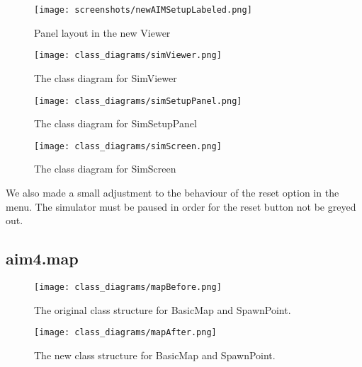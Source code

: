 \begin{figure}[htb]
\texttt{[image: screenshots/newAIMSetupLabeled.png]}
\caption{Panel layout in the new Viewer}
\label{fig:newAIMSetupLabeled}
\end{figure}

\begin{figure}[htb]
\texttt{[image: class\_diagrams/simViewer.png]}
\caption{The class diagram for SimViewer}
\label{fig:simViewer}
\end{figure}

\begin{figure}[htb]
\texttt{[image: class\_diagrams/simSetupPanel.png]}
\caption{The class diagram for SimSetupPanel}
\label{fig:simSetupPanel}
\end{figure}

\begin{figure}[htb]
\texttt{[image: class\_diagrams/simScreen.png]}
\caption{The class diagram for SimScreen}
\label{fig:simScreen}
\end{figure}

We also made a small adjustment to the behaviour of the reset option in the menu. The simulator must be paused in order for the reset button not be greyed out.

\subsection{aim4.map}
\label{subsec:aim4.map}


\begin{figure}[htb]
\texttt{[image: class\_diagrams/mapBefore.png]}
\caption{The original class structure for BasicMap and SpawnPoint.}
\label{fig:mapBefore}
\end{figure}

\begin{figure}[htb]
\texttt{[image: class\_diagrams/mapAfter.png]}
\caption{The new class structure for BasicMap and SpawnPoint.}
\label{fig:mapAfter}
\end{figure}